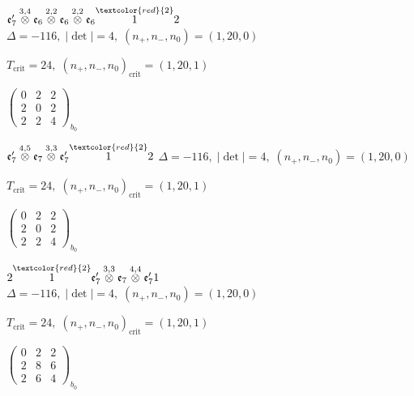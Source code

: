 \documentclass[10pt]{article}
\begin{document}
$\mathfrak{e}_7'\overset{3,4}{\otimes}\mathfrak{e}_6\overset{2,2}{\otimes}\mathfrak{e}_6\overset{2,2}{\otimes}\mathfrak{e}_6\overset{\textcolor{red}{2}}{1}2$ \quad $\Delta=-116,\; |\det|=4,\; (n_+,n_-,n_0)=(1,20,0)$

\hspace{1em}$T_{\text{crit}}=24,\; (n_+,n_-,n_0)_{\text{crit}}=(1,20,1)$

\hspace{2em}$\left(\begin{smallmatrix}0 & 2 & 2 \\ 2 & 0 & 2 \\ 2 & 2 & 4\end{smallmatrix}\right)_{\!b_0}$

\smallskip

$\mathfrak{e}_7'\overset{4,5}{\otimes}\mathfrak{e}_7\overset{3,3}{\otimes}\mathfrak{e}_7'\overset{\textcolor{red}{2}}{1}2$ \quad $\Delta=-116,\; |\det|=4,\; (n_+,n_-,n_0)=(1,20,0)$

\hspace{1em}$T_{\text{crit}}=24,\; (n_+,n_-,n_0)_{\text{crit}}=(1,20,1)$

\hspace{2em}$\left(\begin{smallmatrix}0 & 2 & 2 \\ 2 & 0 & 2 \\ 2 & 2 & 4\end{smallmatrix}\right)_{\!b_0}$

\smallskip

$2\overset{\textcolor{red}{2}}{1}\mathfrak{e}_7'\overset{3,3}{\otimes}\mathfrak{e}_7\overset{4,4}{\otimes}\mathfrak{e}_7'1$ \quad $\Delta=-116,\; |\det|=4,\; (n_+,n_-,n_0)=(1,20,0)$

\hspace{1em}$T_{\text{crit}}=24,\; (n_+,n_-,n_0)_{\text{crit}}=(1,20,1)$

\hspace{2em}$\left(\begin{smallmatrix}0 & 2 & 2 \\ 2 & 8 & 6 \\ 2 & 6 & 4\end{smallmatrix}\right)_{\!b_0}$

\smallskip
\end{document}
